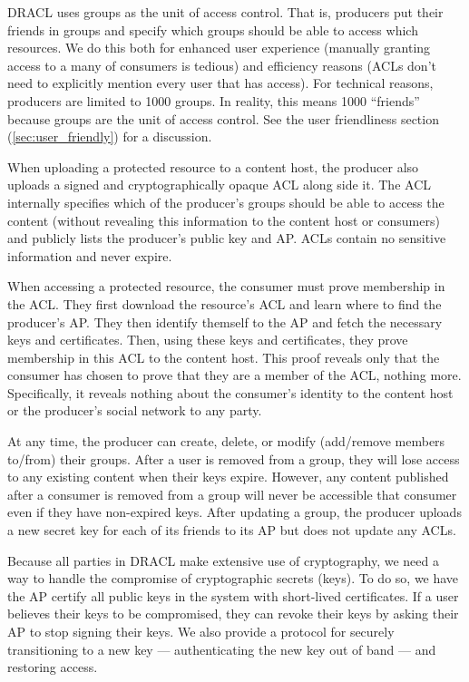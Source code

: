 \documentclass[pdftex,12pt,a4papaer,twoside,notitlepage]{report}
\begin{document}
DRACL uses groups as the unit of access control. That is, producers put their
friends in groups and specify which groups should be able to access which
resources. We do this both for enhanced user experience (manually granting
access to a many of consumers is tedious) and efficiency reasons (ACLs don't
need to explicitly mention every user that has access). For technical reasons,
producers are limited to 1000 groups. In reality, this means 1000 ``friends''
because groups are the unit of access control. See the user friendliness section
(\ref{sec:user_friendly}) for a discussion.

When uploading a protected resource to a content host, the producer also uploads
a signed and cryptographically opaque ACL along side it. The ACL internally
specifies which of the producer's groups should be able to access the content
(without revealing this information to the content host or consumers) and
publicly lists the producer's public key and AP. ACLs contain no sensitive
information and never expire.

When accessing a protected resource, the consumer must prove membership in the
ACL. They first download the resource's ACL and learn where to find the
producer's AP. They then identify themself to the AP and fetch the necessary
keys and certificates. Then, using these keys and certificates, they prove
membership in this ACL to the content host. This proof reveals only that the
consumer has chosen to prove that they are a member of the ACL, nothing more.
Specifically, it reveals nothing about the consumer's identity to the content
host or the producer's social network to any party.

At any time, the producer can create, delete, or modify (add/remove members
to/from) their groups. After a user is removed from a group, they will lose
access to any existing content when their keys expire. However, any content
published after a consumer is removed from a group will never be accessible that
consumer even if they have non-expired keys. After updating a group, the
producer uploads a new secret key for each of its friends to its AP but does not
update any ACLs.
  
Because all parties in DRACL make extensive use of cryptography, we need a way
to handle the compromise of cryptographic secrets (keys). To do so, we have the
AP certify all public keys in the system with short-lived certificates. If a
user believes their keys to be compromised, they can revoke their keys by asking
their AP to stop signing their keys. We also provide a protocol for securely
transitioning to a new key --- authenticating the new key out of band --- and
restoring access.
\end{document}
